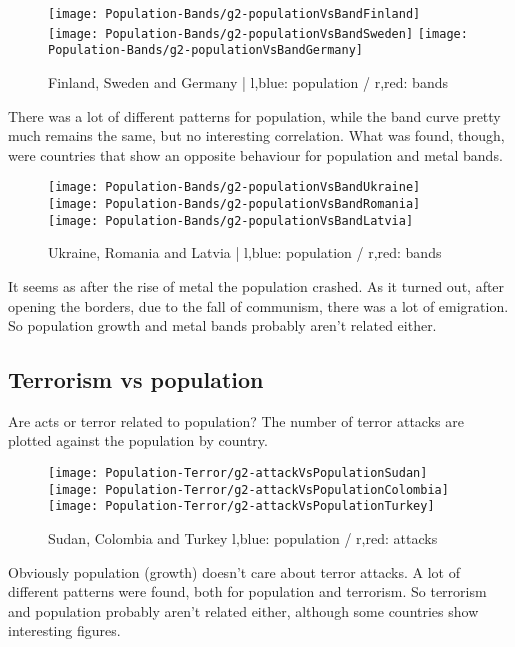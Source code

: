 \begin{figure}[ht!]
	\texttt{[image: Population-Bands/g2-populationVsBandFinland]}
	\centering
	\texttt{[image: Population-Bands/g2-populationVsBandSweden]}
	\texttt{[image: Population-Bands/g2-populationVsBandGermany]}
	\caption{Finland, Sweden and Germany | l,blue: population / r,red: bands}
\end{figure}

There was a lot of different patterns for population, while the band curve pretty much remains the same, but no interesting correlation. What was found, though, were countries that show an opposite behaviour for population and metal bands.

\begin{figure}[hbt!]
	\texttt{[image: Population-Bands/g2-populationVsBandUkraine]}
	\centering
	\texttt{[image: Population-Bands/g2-populationVsBandRomania]}
	\texttt{[image: Population-Bands/g2-populationVsBandLatvia]}
	\caption{Ukraine, Romania and Latvia | l,blue: population / r,red: bands}
\end{figure}
It seems as after the rise of metal the population crashed. As it turned out, after opening the borders, due to the fall of communism, there was a lot of emigration. So population growth and metal bands probably aren't related either.

\newpage

\subsection{Terrorism vs population}
Are acts or terror related to population? The number of terror attacks are plotted against the population by country.

\begin{figure}[hbt!]
	\texttt{[image: Population-Terror/g2-attackVsPopulationSudan]}
	\centering
	\texttt{[image: Population-Terror/g2-attackVsPopulationColombia]}
	\texttt{[image: Population-Terror/g2-attackVsPopulationTurkey]}
	\caption{Sudan, Colombia and Turkey l,blue: population / r,red: attacks}
\end{figure}

Obviously population (growth) doesn't care about terror attacks. A lot of different patterns were found, both for population and terrorism. So terrorism and population probably aren't related either, although some countries show interesting figures.


